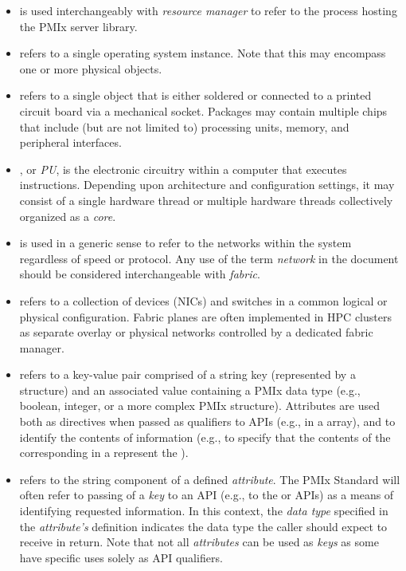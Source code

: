 \begin{itemize}
\item {} is used interchangeably with \emph{resource manager} to refer to the process hosting the \ac{PMIx} server library.

\item {} refers to a single operating system instance. Note that this may encompass one or more physical objects.

\item {} refers to a single object that is either soldered or connected to a printed circuit board via a mechanical socket. Packages may contain multiple chips that include (but are not limited to) processing units, memory, and peripheral interfaces.

\item {}, or \emph{PU}, is the electronic circuitry within a computer that executes instructions. Depending upon architecture and configuration settings, it may consist of a single hardware thread or multiple hardware threads collectively organized as a \emph{core}.

\item {} is used in a generic sense to refer to the networks within the system regardless of speed or protocol. Any use of the term \emph{network} in the document should be considered interchangeable with \emph{fabric}.

\item {} refers to a collection of devices (\acp{NIC}) and switches in a common logical or physical configuration. Fabric planes are often implemented in \ac{HPC} clusters as separate overlay or physical networks controlled by a dedicated fabric manager.

\item {} refers to a key-value pair comprised of a string key (represented by a  structure) and an associated value containing a \ac{PMIx} data type (e.g., boolean, integer, or a more complex \ac{PMIx} structure). Attributes are used both as directives when passed as qualifiers to \acp{API} (e.g., in a  array), and to identify the contents of information (e.g., to specify that the contents of the corresponding  in a  represent the ).

\item {} refers to the string component of a defined \emph{attribute}. The \ac{PMIx} Standard will often refer to passing of a \emph{key} to an \ac{API} (e.g., to the  or  \acp{API}) as a means of identifying requested information. In this context, the \emph{data type} specified in the \emph{attribute's} definition indicates the data type the caller should expect to receive in return. Note that not all \emph{attributes} can be used as \emph{keys} as some have specific uses solely as \ac{API} qualifiers.


\end{itemize}
